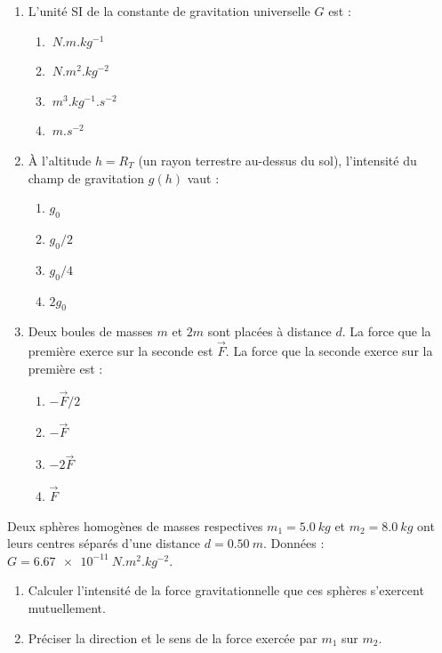 \documentclass[11pt]{article}
\begin{document}
\begin{exercice}
\begin{enumerate}
    \item L'unité SI de la constante de gravitation universelle $G$ est :
    \begin{enumerate}
        \item $\SI{}{N.m.kg^{-1}}$
        \item $\SI{}{N.m^2.kg^{-2}}$
        \item $\SI{}{m^3.kg^{-1}.s^{-2}}$
        \item $\SI{}{m.s^{-2}}$
    \end{enumerate}
    \item À l'altitude $h = R_T$ (un rayon terrestre au-dessus du sol), l'intensité du champ de gravitation $g(h)$ vaut :
    \begin{enumerate}
        \item $g_0$
        \item $g_0/2$
        \item $g_0/4$
        \item $2g_0$
    \end{enumerate}
    \item Deux boules de masses $m$ et $2m$ sont placées à distance $d$. La force que la première exerce sur la seconde est $\vec{F}$. La force que la seconde exerce sur la première est :
    \begin{enumerate}
        \item $-\vec{F}/2$
        \item $-\vec{F}$
        \item $-2\vec{F}$
        \item $\vec{F}$
    \end{enumerate}
\end{enumerate}
\end{exercice}

\begin{exercice}
Deux sphères homogènes de masses respectives $m_1 = \SI{5,0}{kg}$ et $m_2 = \SI{8,0}{kg}$ ont leurs centres séparés d'une distance $d = \SI{0,50}{m}$.
Données : $G = \SI{6,67e-11}{N.m^2.kg^{-2}}$.
\begin{enumerate}
    \item Calculer l'intensité de la force gravitationnelle que ces sphères s'exercent mutuellement.
    \item Préciser la direction et le sens de la force exercée par $m_1$ sur $m_2$.
\end{enumerate}
\end{exercice}
\end{document}
